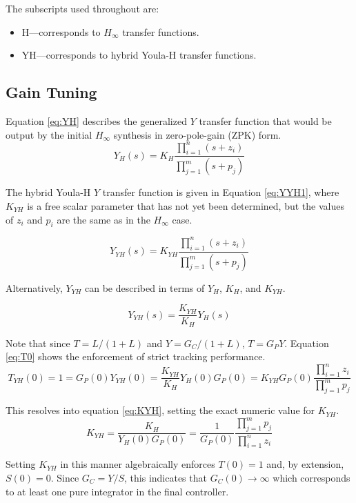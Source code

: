 \documentclass[journal,article,submit,pdftex,moreauthors]{Definitions/mdpi}
\begin{document}
The subscripts used throughout are:
\begin{itemize}
\item H---corresponds to $H_\infty$ transfer functions.
\item YH---corresponds to hybrid Youla-H transfer functions.
\end{itemize}

\subsection{Gain Tuning}
Equation \ref{eq:YH} describes the generalized $Y$ transfer function that would be output by the initial $H_\infty$ synthesis in zero-pole-gain (ZPK) form.
\begin{equation} \label{eq:YH}
Y_H(s) = K_H \frac{\prod_{i=1}^{n} (s + z_i)}{\prod_{j=1}^{m} (s + p_j)}
\end{equation}

The hybrid Youla-H $Y$ transfer function is given in Equation \ref{eq:YYH1}, where $K_{YH}$ is a free scalar parameter that has not yet been determined, but the values of $z_i$ and $p_i$ are the same as in the $H_\infty$ case.

\begin{equation} \label{eq:YYH1}
Y_{YH}(s) = K_{YH} \frac{\prod_{i=1}^{n} (s + z_i)}{\prod_{j=1}^{m} (s + p_j)}
\end{equation}

Alternatively, $Y_{YH}$ can be described in terms of $Y_H$, $K_H$, and $K_{YH}$.

\begin{equation} \label{eq:YYH2}
Y_{YH}(s) = \frac{K_{YH} }{K_{H}}Y_H(s)
\end{equation}

Note that since $T=L/(1+L)$ and $Y=G_C/(1+L)$, $T=G_PY$. Equation \ref{eq:T0} shows the enforcement of strict tracking performance.
\begin{equation} \label{eq:T0}
T_{YH}(0) = 1 = G_P(0)Y_{YH}(0) = \frac{K_{YH}}{K_{H}}Y_H(0)G_P(0) = K_{YH}G_P(0)\frac{\prod_{i=1}^{n} z_i}{\prod_{j=1}^{m} p_j}
\end{equation}

This resolves into equation \ref{eq:KYH}, setting the exact numeric value for $K_{YH}$.
\begin{equation} \label{eq:KYH}
K_{YH} = \frac{K_H}{Y_H(0)G_P(0)}= \frac{1}{G_P(0)}\frac{\prod_{j=1}^{m} p_j}{\prod_{i=1}^{n} z_i} 
\end{equation}

Setting $K_{YH}$ in this manner algebraically enforces $T(0)=1$ and, by extension, $S(0)=0$. Since $G_C=Y/S$, this indicates that $G_C(0)\rightarrow\infty$ which corresponds to at least one pure integrator in the final controller.
\end{document}
